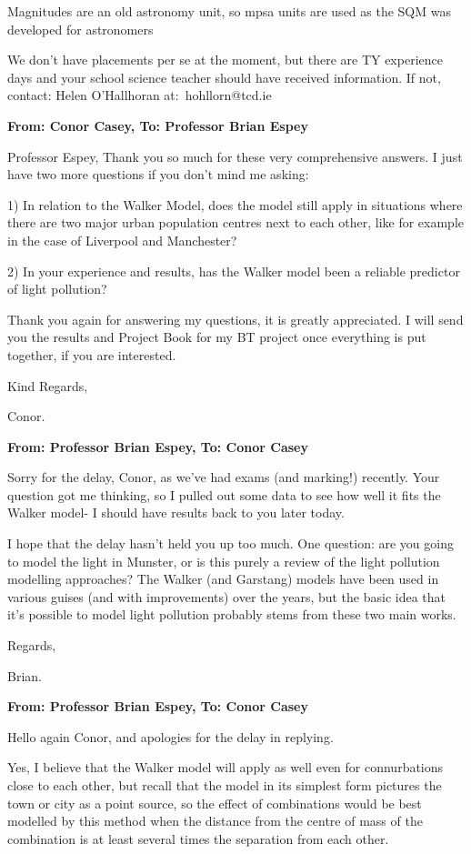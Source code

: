 \begin{appendix}
Magnitudes are an old astronomy unit, so mpsa units are used as the SQM was developed for astronomers

We don't have placements per se at the moment, but there are TY experience days and your school science teacher should have received information. If not, contact: Helen O'Hallhoran at: hohllorn@tcd.ie


\textbf{From: Conor Casey, To: Professor Brian Espey}

Professor Espey,
Thank you so much for these very comprehensive answers. I just have two more questions if you don’t mind me asking:

1) In relation to the Walker Model, does the model still apply in situations where there are two major urban population centres next to each other, like for example in the case of Liverpool and Manchester?

2) In your experience and results, has the Walker model been a reliable predictor of light pollution?

Thank you again for answering my questions, it is greatly appreciated. I will send you the results and Project Book for my BT project once everything is put together, if you are interested.

Kind Regards,

Conor.


\textbf{From: Professor Brian Espey, To: Conor Casey}

Sorry for the delay, Conor, as we've had exams (and marking!) recently. Your question got me thinking, so I pulled out some data to see how well it fits the Walker model- I should have results back to you later today.

I hope that the delay hasn't held you up too much. One question: are you going to model the light in Munster, or is this purely a review of the light pollution modelling approaches? The Walker (and Garstang) models have been used in various guises (and with improvements) over the years, but the basic idea that it's possible to model light pollution probably stems from these two main works.

Regards,

Brian.


\textbf{From: Professor Brian Espey, To: Conor Casey}

Hello again Conor, and apologies for the delay in replying.

Yes, I believe that the Walker model will apply as well even for connurbations close to each other, but recall that the model in its simplest form pictures the town or city as a point source, so the effect of combinations would be best modelled by this method when the distance from the centre of mass of the combination is at least several times the separation from each other. 


\end{appendix}
